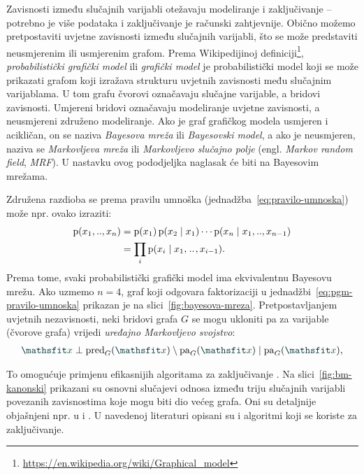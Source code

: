 \documentclass[utf8, diplomski, lmodern]{fer}
\begin{document}
Zavisnosti između slučajnih varijabli otežavaju modeliranje i zaključivanje -- potrebno je više podataka i zaključivanje je računski zahtjevnije. Obično možemo pretpostaviti uvjetne zavisnosti između slučajnih varijabli, što se može predstaviti neusmjerenim ili usmjerenim grafom. Prema Wikipedijinoj definiciji\footnote{\url{https://en.wikipedia.org/wiki/Graphical_model}}, \emph{probabilistički grafički model} ili \emph{grafički model} je probabilistički model koji se može prikazati grafom koji izražava strukturu uvjetnih zavisnosti među slučajnim varijablama. U tom grafu čvorovi označavaju slučajne varijable, a bridovi zavisnosti. Umjereni bridovi označavaju modeliranje uvjetne zavisnosti, a neusmjereni združeno modeliranje. Ako je graf grafičkog modela usmjeren i acikličan, on se naziva \emph{Bayesova mreža} ili \emph{Bayesovski model}, a ako je neusmjeren, naziva se \emph{Markovljeva mreža} ili \emph{Markovljevo slučajno polje} (engl. \textit{Markov random field}, \textit{MRF}). U nastavku ovog pododjeljka naglasak će biti na Bayesovim mrežama.

Združena razdioba se prema pravilu umnoška (jednadžba~\ref{eq:pravilo-umnoska}) može npr. ovako izraziti:
\begin{align}
\operatorname*{\mathrm{p}}(x_1,..,x_n) 
&= \operatorname*{\mathrm{p}}(x_1)\operatorname*{\mathrm{p}}(x_2\mid x_1)\cdots\operatorname*{\mathrm{p}}(x_n\mid x_1,..,x_{n-1}) \\
&= \prod_i\operatorname*{\mathrm{p}}(x_i\mid x_1,\mkern1.5mu{..}\mkern1.5mu,x_{i-1}) \text{.}
\label{eq:pgm-pravilo-umnoska}
\end{align} 
Prema tome, svaki probabilistički grafički model ima ekvivalentnu Bayesovu mrežu. Ako uzmemo $n=4$, graf koji odgovara faktorizaciji u jednadžbi~\eqref{eq:pgm-pravilo-umnoska} prikazan je na slici~\ref{fig:bayesova-mreza}. Pretpostavljanjem uvjetnih nezavisnosti, neki bridovi grafa $G$ se mogu ukloniti pa za varijable (čvorove grafa) vrijedi \emph{uređajno Markovljevo svojstvo}:
\begin{align}
\rvar x\perp \pred_G(\rvar x) \setminus \pa_G(\rvar x) \mid \pa_G(\rvar x),
\end{align}

To omogućuje primjenu efikasnijih algoritama za zaključivanje \citep{Murphy:2012:MLPP}.
Na slici~\ref{fig:bm-kanonski} prikazani su osnovni slučajevi odnosa između triju slučajnih varijabli povezanih zavisnostima koje mogu biti dio većeg grafa. Oni su detaljnije objašnjeni npr. u \cite{Bishop:2006:PRML} i \cite{Alpaydin:2014:IML}. U navedenoj literaturi opisani su i algoritmi koji se koriste za zaključivanje.
\end{document}
